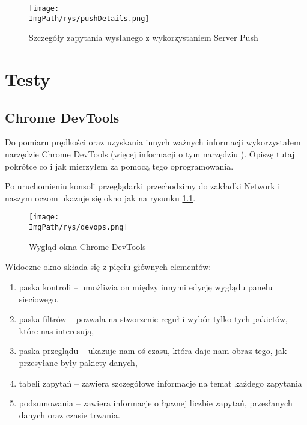 \documentclass[a4paper,12pt,twoside,openany]{report}
\newcommand{\ImgPath}{.}
\begin{document}
\begin{figure}[!htbp]
	\begin{center}
\centering
\texttt{[image: \\ImgPath/rys/pushDetails.png]}
\end{center}
	\caption{Szczegóły zapytania wysłanego z wykorzystaniem Server Push}
	\label{schematPushDetails}
\end{figure}

\chapter{Testy}

\section{Chrome DevTools}

Do pomiaru prędkości oraz uzyskania innych ważnych informacji wykorzystałem narzędzie Chrome DevTools (więcej informacji o tym narzędziu \cite{devtools}).
Opiszę tutaj pokrótce co i jak mierzyłem za pomocą tego oprogramowania.

Po uruchomieniu konsoli przeglądarki przechodzimy do zakładki Network i naszym oczom ukazuje się okno jak na rysunku \ref{schematDevops}.

\begin{figure}[!htbp]
	\begin{center}
\centering
\texttt{[image: \\ImgPath/rys/devops.png]}
\end{center}
	\caption{Wygląd okna Chrome DevTools}
	\label{schematDevops}
\end{figure}

Widoczne okno składa się z pięciu głównych elementów:
\begin{enumerate}
	\item paska kontroli -- umożliwia on między innymi edycję wyglądu panelu sieciowego,
	\item paska filtrów -- pozwala na stworzenie reguł i wybór tylko tych pakietów, które nas interesują,
	\item paska przeglądu -- ukazuje nam oś czasu, która daje nam obraz tego, jak przesyłane były pakiety danych,
	\item tabeli zapytań -- zawiera szczegółowe informacje na temat każdego zapytania
	\item podsumowania -- zawiera informacje o łącznej liczbie zapytań, przesłanych danych oraz czasie trwania.
\end{enumerate}
\end{document}
